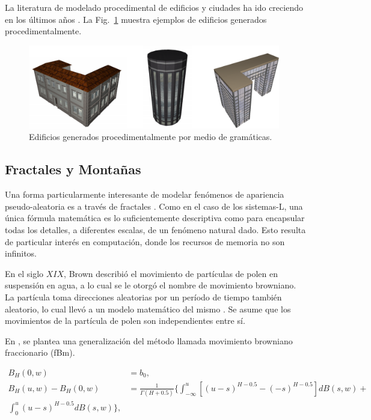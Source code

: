 La literatura de modelado procedimental de edificios y ciudades ha ido creciendo en los últimos años \cite{Parish2001,Muller2006}.
La Fig.~\ref{fg:edificios} muestra ejemplos de edificios generados procedimentalmente.



\begin{figure}
\center
\includegraphics[width=11cm]{figures/edificios}
\caption{Edificios generados procedimentalmente por medio de gramáticas.}
\label{fg:edificios}
\end{figure}

\subsection{Fractales y Montañas}
Una forma particularmente interesante de modelar fenómenos de apariencia pseudo-aleatoria es a través de fractales \cite{Mandelbrot1983}.
Como en el caso de los sistemas-L, una única fórmula matemática es lo suficientemente descriptiva como para encapsular todas los detalles, a diferentes escalas, de un fenómeno natural dado.
Esto resulta de particular interés en computación, donde los recursos de memoria no son infinitos.

En el siglo $XIX$, Brown describió el movimiento de partículas de polen en suspensión en agua, a lo cual se le otorgó el nombre de movimiento browniano.
La partícula toma direcciones aleatorias por un período de tiempo también aleatorio, lo cual llevó a un modelo matemático del mismo \cite{}.
Se asume que los movimientos de la partícula de polen son independientes entre sí.

En \cite{Mandelbrot1968}, se plantea una generalización del método llamada movimiento browniano fraccionario (fBm). 

\begin{equation}
\begin{aligned}
B_{H}(0,w) &= b_{0},\\
B_{H}(u,w)- B_{H}(0,w) &= \frac{1}{\Gamma(H+0.5)} \big\{ \int_{-\infty}^{u} [(u-s)^{H-0.5} - (-s)^{H-0.5} ] dB(s,w) + \\
 \int_{0}^{u} (u-s)^{H-0.5} dB(s,w) \big \},
\end{aligned}
\end{equation}

